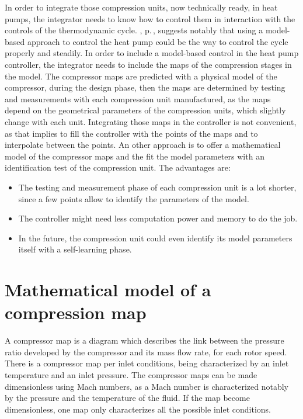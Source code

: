 In order to integrate those compression units, now technically ready,
in heat pumps, the integrator needs to know how to control them in
interaction with the controls of the thermodynamic
cycle. ,
p.\,\pageref{sec:awp-issue-control-indus}, suggests notably that using
a model-based approach to control the heat pump could be the way to
control the cycle properly and steadily. In order to include a
model-based control in the heat pump controller, the integrator needs
to include the maps of the compression stages in the model. The
compressor maps are predicted with a physical model of the compressor,
during the design phase, then the maps are determined by testing and
measurements with each compression unit manufactured, as the maps
depend on the geometrical parameters of the compression units, which
slightly change with each unit. Integrating those maps in the
controller is not convenient, as that implies to fill the controller
with the points of the maps and to interpolate between the points. An
other approach is to offer a mathematical model of the compressor maps
and the fit the model parameters with an identification test of the
compression unit. The advantages are:

\begin{itemize}
\item The testing and measurement phase of each compression unit is a
  lot shorter, since a few points allow to identify the parameters of
  the model.
\item The controller might need less computation power and memory to do the job.
\item In the future, the compression unit could even identify its
  model parameters itself with a self-learning phase.
\end{itemize}

\section{Mathematical model of a compression map}
\label{sec:math-model-model}
\label{sec:op-domain}

A compressor map is a diagram which describes the link between the
pressure ratio developed by the compressor and its mass flow rate, for
each rotor speed. There is a compressor map per inlet conditions,
being characterized by an inlet temperature and an inlet pressure. The
compressor maps can be made dimensionless using Mach
numbers\citep{Haugwitz-2002a}, as a Mach number is characterized
notably by the pressure and the temperature of the fluid. If the map
become dimensionless, one map only characterizes all the possible
inlet conditions.

